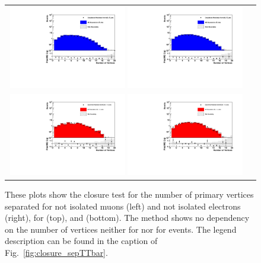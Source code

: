 \begin{figure}[tbhn]
\begin{center}
\begin{tabular}{cc}
\includegraphics[width=0.49\textwidth]{lostlepton/plots/closure/NVttbarIsoE.pdf}
\includegraphics[width=0.49\textwidth]{lostlepton/plots/closure/NVttbarIsoMu.pdf}\\
\includegraphics[width=0.49\textwidth]{lostlepton/plots/closure/NVwIsoE.pdf}
\includegraphics[width=0.49\textwidth]{lostlepton/plots/closure/NVwIsoMu.pdf}\\
\end{tabular}
\end{center}
\caption{These plots show the closure test for the number of primary vertices separated for not isolated muons (left) and not isolated electrons (right), for \ttbar (top), and \wpj (bottom). The method shows no dependency on the number of vertices neither for \ttbar nor for \wpj events. The legend description can be found in the caption of Fig.~\ref{fig:closure_sepTTbar}.}
\label{fig:pileup_iso}
\end{figure}

